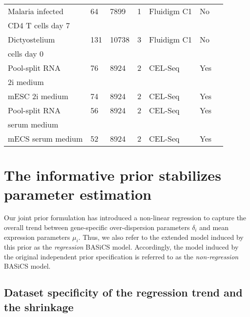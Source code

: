 \begin{table}[hb	]
\begin{tabular}{lllllll}
Malaria infected  & 64       & 7899     & 1          & Fluidigm C1       & No   & \citep{Lonnberg2017}         \\
CD4\plus{}  T cells day 7    &   & &  &  &  &   \\
\midrule

Dictyostelium             & 131      & 10738    & 3          & Fluidigm C1       & No   & \citep{Antolovic2017}        \\
cells day 0  &  &   &   &  & & \\
\midrule

Pool-split RNA                 & 76       & 8924     & 2          & CEL-Seq           & Yes  & \citep{Grun2014}            \\
2i medium  &  &  & &  &  & \\
\midrule

mESC 2i medium    & 74       & 8924     & 2          & CEL-Seq           & Yes  & \citep{Grun2014} \\
\midrule

Pool-split RNA             & 56       & 8924     & 2          & CEL-Seq           & Yes  & \citep{Grun2014}            \\
serum medium &  &      &         &   &   &  \\
\midrule

mECS serum medium & 52       & 8924     & 2          & CEL-Seq           & Yes  & \citep{Grun2014} \\
\bottomrule       
\end{tabular}
\end{table}


\section{The informative prior stabilizes parameter estimation}
\label{sec2:stabilization}

Our joint prior formulation has introduced a non-linear regression to capture the overall trend between gene-specific over-dispersion parameters $\delta_i$ and mean expression parameters $\mu_i$. Thus, we also refer to the extended model induced by this prior as the \textit{regression} BASiCS model. Accordingly, the model induced by the original independent prior specification \citep{Vallejos2016} is referred to as the \textit{non-regression} BASiCS model.\\ 

\subsection{Dataset specificity of the regression trend and the shrinkage}

